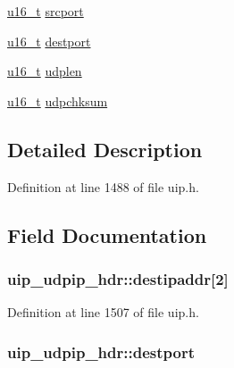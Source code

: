 \begin{DoxyCompactItemize}
\item 
\hyperlink{group__uipfw_ga77570ac4fcab86864fa1916e55676da2}{u16\_\-t} \hyperlink{structuip__udpip__hdr_ab20096ae4953caaa42f6bb2373c4494c}{srcport}
\item 
\hyperlink{group__uipfw_ga77570ac4fcab86864fa1916e55676da2}{u16\_\-t} \hyperlink{structuip__udpip__hdr_ae82f68cb91d8688a619d55d2a8572979}{destport}
\item 
\hyperlink{group__uipfw_ga77570ac4fcab86864fa1916e55676da2}{u16\_\-t} \hyperlink{structuip__udpip__hdr_ac92d2f194f096e84791f95d7e8f0ba92}{udplen}
\item 
\hyperlink{group__uipfw_ga77570ac4fcab86864fa1916e55676da2}{u16\_\-t} \hyperlink{structuip__udpip__hdr_a858f970feb7462871c814953697a8ad7}{udpchksum}
\end{DoxyCompactItemize}


\subsection{Detailed Description}


Definition at line 1488 of file uip.h.



\subsection{Field Documentation}
\hypertarget{structuip__udpip__hdr_abe2c98748e180c1747823cd2fb8ecf0e}{
\subsubsection[{destipaddr}]{ {\bf uip\_\-udpip\_\-hdr::destipaddr}\mbox{[}2\mbox{]}}}
\label{structuip__udpip__hdr_abe2c98748e180c1747823cd2fb8ecf0e}


Definition at line 1507 of file uip.h.

\hypertarget{structuip__udpip__hdr_ae82f68cb91d8688a619d55d2a8572979}{
\subsubsection[{destport}]{ {\bf uip\_\-udpip\_\-hdr::destport}}}
\label{structuip__udpip__hdr_ae82f68cb91d8688a619d55d2a8572979}


